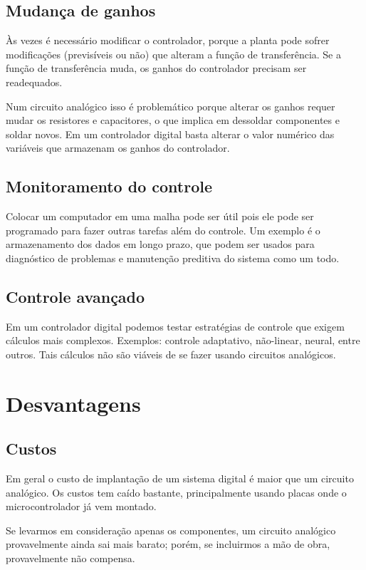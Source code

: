 \documentclass[12pt, a4paper]{article}
\begin{document}
\subsection{Mudança de ganhos}

Às vezes é necessário modificar o controlador, porque a planta pode sofrer modificações (previsíveis ou não) que alteram a função de transferência. Se a função de transferência muda, os ganhos do controlador precisam ser readequados. 

Num circuito analógico isso é problemático porque alterar os ganhos requer mudar os resistores e capacitores, o que implica em dessoldar componentes e soldar novos. Em um controlador digital basta alterar o valor numérico das variáveis que armazenam os ganhos do controlador.

\subsection{Monitoramento do controle}

Colocar um computador em uma malha pode ser útil pois ele pode ser programado para fazer outras tarefas além do controle. Um exemplo é o armazenamento dos dados em longo prazo, que podem ser usados para diagnóstico de problemas e manutenção preditiva do sistema como um todo. 

\subsection{Controle avançado}

Em um controlador digital podemos testar estratégias de controle que exigem cálculos mais complexos. Exemplos: controle adaptativo, não-linear, neural, entre outros. Tais cálculos não são viáveis de se fazer usando circuitos analógicos.

\section{Desvantagens} 

\subsection{Custos}
Em geral o custo de implantação de um sistema digital é maior que um circuito analógico. Os custos tem caído bastante, principalmente usando placas onde o microcontrolador já vem montado. 

Se levarmos em consideração apenas os componentes, um circuito analógico provavelmente ainda sai mais barato; porém, se incluirmos a mão de obra, provavelmente não compensa. 
\end{document}
